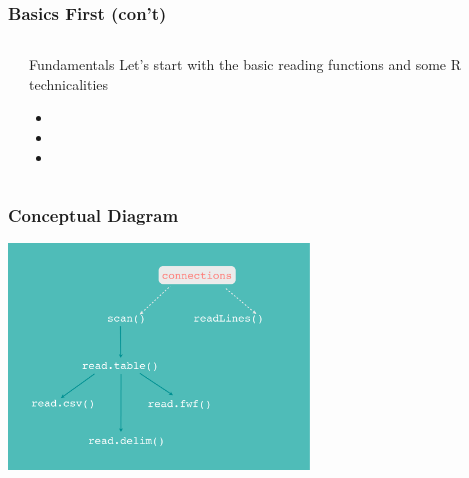 \documentclass{beamer}\usepackage[]{graphicx}\usepackage[]{color}
\begin{document}
\begin{frame}
\frametitle{Basics First (con't)}

\begin{columns}[t]
\begin{column}{0.2\textwidth}
\end{column}
\begin{column}{0.6\textwidth}

\begin{block}{Fundamentals}
Let's start with the basic reading functions and some R technicalities
 \begin{itemize}
  \item {}
  \item {}
  \item {}
 \end{itemize}
\end{block}

\end{column}
\begin{column}{0.1\textwidth}
\end{column}
\end{columns}

\end{frame}


\begin{frame}
\frametitle{Conceptual Diagram}

\begin{center}
\includegraphics[width=8cm]{images/read_functions.pdf}
\end{center}

\end{frame}

\end{document}
